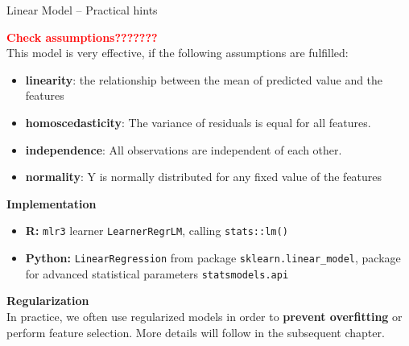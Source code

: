 \documentclass[11pt,compress,t,notes=noshow, xcolor=table]{beamer}
\newcommand{\highlight}[1]{\textcolor{highlightcol}{\textbf{#1}}}
\let\code=\texttt
\begin{document}
\begin{frame}{Linear Model -- Practical hints}

\footnotesize

 \highlight{ \textcolor{red}{Check assumptions???????} }\\
 This model is very effective, if the following assumptions are fulfilled:
 \begin{itemize}\footnotesize
  \item \textbf{linearity}: the relationship between the mean of predicted value and the features
  \item \textbf{homoscedasticity}: The variance of residuals is equal for all features.
  \item \textbf{independence}: All observations are independent of each other.
  \item \textbf{normality}: Y is normally distributed for any fixed value of the features
\end{itemize}


\medskip

  \highlight{Implementation}
  
  \begin{itemize}
    \item \textbf{R:} \code{mlr3} learner \code{LearnerRegrLM}, calling \code{stats::lm()}
    \item \textbf{Python:} \code{LinearRegression} from package 
    \code{sklearn.linear\_model}, package for advanced statistical parameters 
    \code{statsmodels.api} 
  \end{itemize}

\medskip

 \highlight{Regularization} \\

 In practice, we often use regularized models in order to \textbf{prevent overfitting} or perform feature selection. More details will follow in the subsequent chapter. 


\end{frame}

\end{document}
